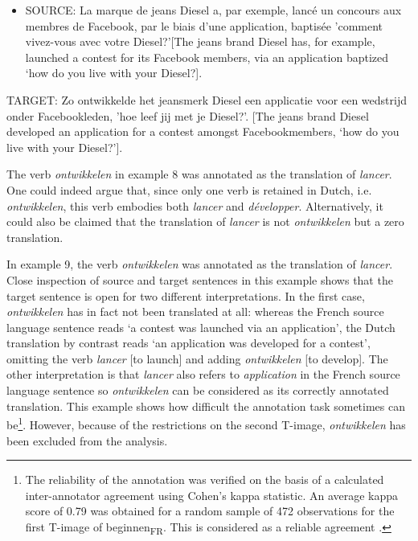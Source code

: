 \begin{itemize}
\item \begin{styleVoorbeeld}
SOURCE: La marque de jeans Diesel a, par exemple, lancé un concours aux membres de Facebook, par le biais d'une application, baptisée 'comment vivez-vous avec votre Diesel?'[The jeans brand Diesel has, for example, launched a contest for its Facebook members, via an application baptized ‘how do you live with your Diesel?].
\end{styleVoorbeeld}\end{itemize}
\begin{styleVoorbeeld}
TARGET: Zo ontwikkelde het jeansmerk Diesel een applicatie voor een wedstrijd onder Facebookleden, 'hoe leef jij met je Diesel?'. [The jeans brand Diesel developed an application for a contest amongst Facebookmembers, ‘how do you live with your Diesel?’].
\end{styleVoorbeeld}


The verb \textit{ontwikkelen} in example 8 was annotated as the translation of \textit{lancer}. One could indeed argue that, since only one verb is retained in Dutch, i.e. \textit{ontwikkelen}, this verb embodies both \textit{lancer} and \textit{développer}. Alternatively, it could also be claimed that the translation of \textit{lancer} is not \textit{ontwikkelen} but a zero translation.



In example 9, the verb \textit{ontwikkelen} was annotated as the translation of \textit{lancer}. Close inspection of source and target sentences in this example shows that the target sentence is open for two different interpretations. In the first case, \textit{ontwikkelen} has in fact not been translated at all: whereas the French source language sentence reads ‘a contest was launched via an application’, the Dutch translation by contrast reads ‘an application was developed for a contest’, omitting the verb \textit{lancer} [to launch] and adding \textit{ontwikkelen} [to develop]. The other interpretation is that \textit{lancer} also refers to \textit{application} in the French source language sentence so \textit{ontwikkelen} can be considered as its correctly annotated translation. This example shows how difficult the annotation task sometimes can be\footnote{The reliability of the annotation was verified on the basis of a calculated inter-annotator agreement using Cohen’s kappa statistic. An average kappa score of 0.79 was obtained for a random sample of 472 observations for the first T-image of beginnen\textsubscript{FR}. This is considered as a reliable agreement  \citep{carletta_assessing_1996}.}. However, because of the restrictions on the second T-image, \textit{ontwikkelen} has been excluded from the analysis.




